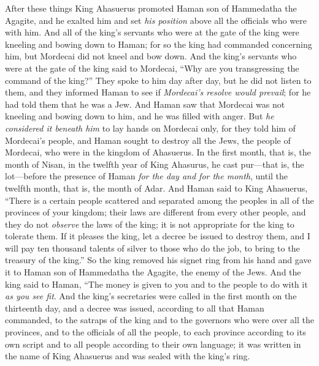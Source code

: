 \begin{biblechapter} %
 After these things King Ahasuerus promoted Haman son of Hammedatha the Agagite, and he exalted him and set \textit{his position} above all the officials who were with him.
\verse And all of the king’s servants who were at the gate of the king were kneeling and bowing down to Haman; for so the king had commanded concerning him, but Mordecai did not kneel and bow down.
\verse And the king’s servants who were at the gate of the king said to Mordecai, “Why are you transgressing the command of the king?”
\verse They spoke to him day after day, but he did not listen to them, and they informed Haman to see if \textit{Mordecai’s resolve would prevail}; for he had told them that he was a Jew.
\verse And Haman saw that Mordecai was not kneeling and bowing down to him, and he was filled with anger.
\verse But \textit{he considered it beneath him} to lay hands on Mordecai only, for they told him of Mordecai’s people, and Haman sought to destroy all the Jews, the people of Mordecai, who were in the kingdom of Ahasuerus.
\verse In the first month, that is, the month of Nisan, in the twelfth year of King Ahasurus, he cast pur—that is, the lot—before the presence of Haman \textit{for the day and for the month}, until the twelfth month, that is, the month of Adar.
\verse And Haman said to King Ahasuerus, “There is a certain people scattered and separated among the peoples in all of the provinces of your kingdom; their laws are different from every other people, and they do not \textit{observe} the laws of the king; it is not appropriate for the king to tolerate them.
\verse If it pleases the king, let a decree be issued to destroy them, and I will pay ten thousand talents of silver to those who do the job, to bring to the treasury of the king.”
\verse So the king removed his signet ring from his hand and gave it to Haman son of Hammedatha the Agagite, the enemy of the Jews.
\verse And the king said to Haman, “The money is given to you and to the people to do with it \textit{as you see fit}.
\verse And the king’s secretaries were called in the first month on the thirteenth day, and a decree was issued, according to all that Haman commanded, to the satraps of the king and to the governors who were over all the provinces, and to the officials of all the people, to each province according to its own script and to all people according to their own language; it was written in the name of King Ahasuerus and was sealed with the king’s ring.

\end{biblechapter}
